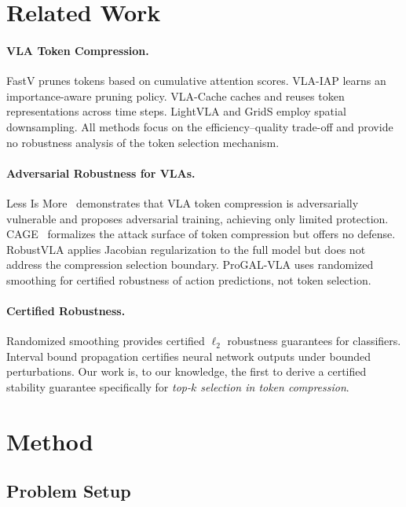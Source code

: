 \documentclass[10pt,twocolumn]{article}
\begin{document}
\section{Related Work}
\label{sec:related}

\paragraph{VLA Token Compression.}
FastV prunes tokens based on cumulative attention scores. VLA-IAP learns an importance-aware pruning policy. VLA-Cache caches and reuses token representations across time steps. LightVLA and GridS employ spatial downsampling. All methods focus on the efficiency--quality trade-off and provide no robustness analysis of the token selection mechanism.

\paragraph{Adversarial Robustness for VLAs.}
Less Is More~\cite{lessismore2025} demonstrates that VLA token compression is adversarially vulnerable and proposes adversarial training, achieving only limited protection. CAGE~\cite{cage2026} formalizes the attack surface of token compression but offers no defense. RobustVLA applies Jacobian regularization to the full model but does not address the compression selection boundary. ProGAL-VLA uses randomized smoothing for certified robustness of action predictions, not token selection.

\paragraph{Certified Robustness.}
Randomized smoothing provides certified $\ell_2$ robustness guarantees for classifiers. Interval bound propagation certifies neural network outputs under bounded perturbations. Our work is, to our knowledge, the first to derive a certified stability guarantee specifically for \emph{top-$k$ selection in token compression}.

\section{Method}
\label{sec:method}

\subsection{Problem Setup}
\end{document}
